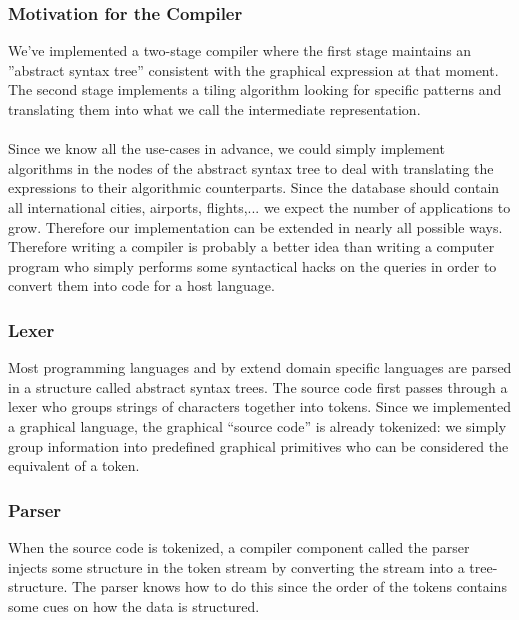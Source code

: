 \subsubsection{Motivation for the Compiler}
\label{sssection:motivation_for_the_compiler}
We've implemented a two-stage compiler where the first stage maintains an
''abstract syntax tree'' consistent with the graphical expression at that
moment. The second stage implements a tiling algorithm looking for specific
patterns and translating them into what we call the intermediate representation.
\paragraph{}
Since we know all the use-cases in advance, we could simply implement
algorithms in the nodes of the abstract syntax tree to deal with translating
the expressions to their algorithmic counterparts. Since the database should
contain all international cities, airports, flights,... we expect the number of
applications to grow. Therefore our implementation can be extended in nearly
all possible ways. Therefore writing a compiler is probably a better idea than
writing a computer program who simply performs some syntactical hacks on the
queries in order to convert them into code for a host language.
\subsubsection{Lexer}
Most programming languages and by extend domain specific languages are parsed
in a structure called abstract syntax trees. The source code first passes
through a lexer who groups strings of characters together into tokens. Since we
implemented a graphical language, the graphical ``source code'' is already
tokenized: we simply group information into predefined graphical primitives who
can be considered the equivalent of a token.
\subsubsection{Parser}
When the source code is tokenized, a compiler component called the parser
injects some structure in the token stream by converting the stream into a
tree-structure. The parser knows how to do this since the order of the tokens
contains some cues on how the data is structured.
